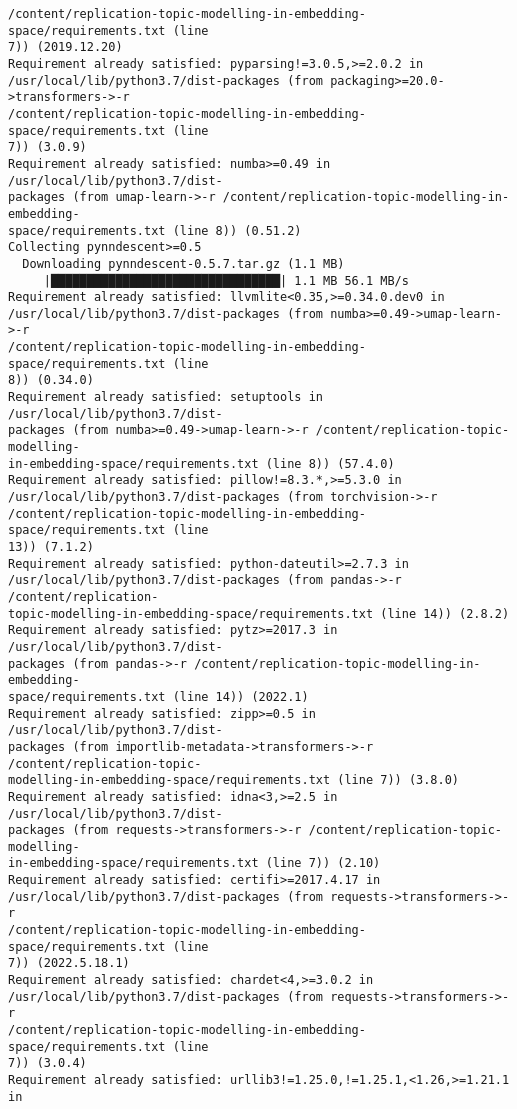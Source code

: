 \documentclass[11pt]{article}
\begin{document}
\begin{Verbatim}[commandchars=\\\{\}]
/content/replication-topic-modelling-in-embedding-space/requirements.txt (line
7)) (2019.12.20)
Requirement already satisfied: pyparsing!=3.0.5,>=2.0.2 in
/usr/local/lib/python3.7/dist-packages (from packaging>=20.0->transformers->-r
/content/replication-topic-modelling-in-embedding-space/requirements.txt (line
7)) (3.0.9)
Requirement already satisfied: numba>=0.49 in /usr/local/lib/python3.7/dist-
packages (from umap-learn->-r /content/replication-topic-modelling-in-embedding-
space/requirements.txt (line 8)) (0.51.2)
Collecting pynndescent>=0.5
  Downloading pynndescent-0.5.7.tar.gz (1.1 MB)
     |████████████████████████████████| 1.1 MB 56.1 MB/s
Requirement already satisfied: llvmlite<0.35,>=0.34.0.dev0 in
/usr/local/lib/python3.7/dist-packages (from numba>=0.49->umap-learn->-r
/content/replication-topic-modelling-in-embedding-space/requirements.txt (line
8)) (0.34.0)
Requirement already satisfied: setuptools in /usr/local/lib/python3.7/dist-
packages (from numba>=0.49->umap-learn->-r /content/replication-topic-modelling-
in-embedding-space/requirements.txt (line 8)) (57.4.0)
Requirement already satisfied: pillow!=8.3.*,>=5.3.0 in
/usr/local/lib/python3.7/dist-packages (from torchvision->-r
/content/replication-topic-modelling-in-embedding-space/requirements.txt (line
13)) (7.1.2)
Requirement already satisfied: python-dateutil>=2.7.3 in
/usr/local/lib/python3.7/dist-packages (from pandas->-r /content/replication-
topic-modelling-in-embedding-space/requirements.txt (line 14)) (2.8.2)
Requirement already satisfied: pytz>=2017.3 in /usr/local/lib/python3.7/dist-
packages (from pandas->-r /content/replication-topic-modelling-in-embedding-
space/requirements.txt (line 14)) (2022.1)
Requirement already satisfied: zipp>=0.5 in /usr/local/lib/python3.7/dist-
packages (from importlib-metadata->transformers->-r /content/replication-topic-
modelling-in-embedding-space/requirements.txt (line 7)) (3.8.0)
Requirement already satisfied: idna<3,>=2.5 in /usr/local/lib/python3.7/dist-
packages (from requests->transformers->-r /content/replication-topic-modelling-
in-embedding-space/requirements.txt (line 7)) (2.10)
Requirement already satisfied: certifi>=2017.4.17 in
/usr/local/lib/python3.7/dist-packages (from requests->transformers->-r
/content/replication-topic-modelling-in-embedding-space/requirements.txt (line
7)) (2022.5.18.1)
Requirement already satisfied: chardet<4,>=3.0.2 in
/usr/local/lib/python3.7/dist-packages (from requests->transformers->-r
/content/replication-topic-modelling-in-embedding-space/requirements.txt (line
7)) (3.0.4)
Requirement already satisfied: urllib3!=1.25.0,!=1.25.1,<1.26,>=1.21.1 in

\end{Verbatim}
\end{document}
